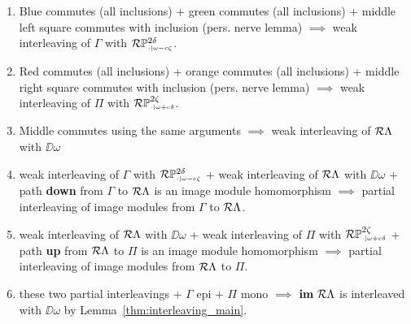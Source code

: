 \begin{enumerate}
  \item Blue commutes (all inclusions) + green commutes (all inclusions) + middle left square commutes with inclusion (pers. nerve lemma) $\implies$ weak interleaving of $\Gamma$ with $\mathcal{R}\mathbb{P}_{\scriptscriptstyle \cdot\mid \omega-c\zeta}^{2\delta}$.
  \item Red commutes (all inclusions) + orange commutes (all inclusions) + middle right square commutes with inclusion (pers. nerve lemma) $\implies$ weak interleaving of $\Pi$ with $\mathcal{R}\mathbb{P}_{\scriptscriptstyle \cdot\mid \omega+c\delta}^{2\zeta}$.
  \item Middle commutes using the same arguments $\implies$ weak interleaving of $\mathcal{R}\Lambda$ with $\DD{\omega}$
  \item weak interleaving of $\Gamma$ with $\mathcal{R}\mathbb{P}_{\scriptscriptstyle \cdot\mid \omega-c\zeta}^{2\delta}$ + weak interleaving of $\mathcal{R}\Lambda$ with $\DD{\omega}$ + path \textbf{down} from $\Gamma$ to $\mathcal{R}\Lambda$ is an image module homomorphism $\implies$ partial interleaving of image modules from $\Gamma$ to $\mathcal{R}\Lambda$.
  \item weak interleaving of $\mathcal{R}\Lambda$ with $\DD{\omega}$ + weak interleaving of $\Pi$ with $\mathcal{R}\mathbb{P}_{\scriptscriptstyle \cdot\mid \omega+c\delta}^{2\zeta}$ + path \textbf{up} from $\mathcal{R}\Lambda$ to $\Pi$ is an image module homomorphism $\implies$ partial interleaving of image modules from $\mathcal{R}\Lambda$ to $\Pi$.
  \item these two partial interleavings + $\Gamma$ epi + $\Pi$ mono $\implies$ $\mathbf{im}~\mathcal{R}\Lambda$ is interleaved with $\DD{\omega}$ by Lemma~\ref{thm:interleaving_main}.
\end{enumerate}
